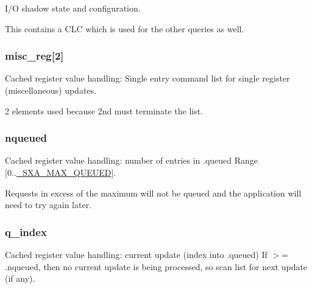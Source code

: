 I/\-O shadow state and configuration. 

This contains a C\-L\-C which is used for the other queries as well. \hypertarget{structsxa__node__t_ae825a2809f705ef65c961e8bfe3e98cc}{
\subsubsection[{misc\-\_\-reg}]{ misc\-\_\-reg\mbox{[}2\mbox{]}}}\label{structsxa__node__t_ae825a2809f705ef65c961e8bfe3e98cc}


Cached register value handling\-: Single entry command list for single register (miscellaneous) updates. 

2 elements used because 2nd must terminate the list. \hypertarget{structsxa__node__t_a8de35431542d2c2508bb17ac8fa48a84}{
\subsubsection[{nqueued}]{ nqueued}}\label{structsxa__node__t_a8de35431542d2c2508bb17ac8fa48a84}


Cached register value handling\-: number of entries in .queued Range \mbox{[}0..\hyperlink{sxa_8h_a9e47d5fe0e89846d0bc2b3f1584382ae}{\-\_\-\-S\-X\-A\-\_\-\-M\-A\-X\-\_\-\-Q\-U\-E\-U\-E\-D}\mbox{]}. 

Requests in excess of the maximum will not be queued and the application will need to try again later. \hypertarget{structsxa__node__t_a8aa02a31241baba968d2892c98971c65}{
\subsubsection[{q\-\_\-index}]{ q\-\_\-index}}\label{structsxa__node__t_a8aa02a31241baba968d2892c98971c65}


Cached register value handling\-: current update (index into .queued) If $>$= .nqueued, then no current update is being processed, so scan list for next update (if any). 


